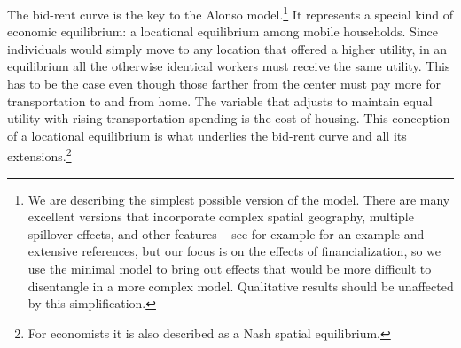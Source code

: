  The \gls{bid-rent curve} is the key to the Alonso model.\footnote{We are describing the simplest possible version of the model. There are many excellent versions that incorporate complex spatial geography, multiple spillover effects, and other features -- see for example \cite{ahlfeldtECONOMICSDENSITYEVIDENCE2015} for an example and extensive references, but our focus is on the effects of financialization, so we use the minimal model to bring out effects that would be more difficult to disentangle in a more complex model. Qualitative results should be unaffected by this simplification.}  It represents a special  kind of economic equilibrium:   a locational equilibrium among mobile households. Since individuals would simply move to any location that offered a higher utility, in an equilibrium all the otherwise identical workers must receive the same utility. This has to be the case even though those farther from the center must pay more for transportation to and from home. The variable that  adjusts to maintain equal utility with rising transportation spending is the cost of housing. This conception of a \gls{locational equilibrium} is what underlies the bid-rent curve and all its extensions.\footnote{For economists it is also described as a Nash spatial equilibrium.}








